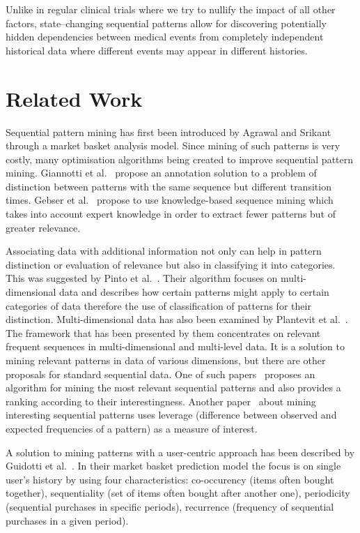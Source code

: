 \documentclass[runningheads,a4paper]{llncs}
\begin{document}
Unlike in regular clinical trials where we try to nullify the impact of all other factors, state--changing sequential patterns allow for discovering potentially hidden dependencies between medical events from completely independent historical data where different events may appear in different histories.

\section{Related Work}
\label{sec:related}
Sequential pattern mining has first been introduced by Agrawal and Srikant~\cite{Agrawal:1995} through a market basket analysis model.
Since mining of such patterns is very costly, many optimisation algorithms being created to improve sequential pattern mining.
Giannotti et al.~\cite{Giannotti:2006} propose an annotation solution to a problem of distinction between patterns with the same sequence but different transition times.
Gebser et al.~\cite{Gebser:2016} propose to use knowledge-based sequence mining which takes into account expert knowledge in order to extract fewer patterns but of greater relevance.

Associating data with additional information not only can help in pattern distinction or evaluation of relevance but also in classifying it into categories.
This was suggested by Pinto et al.~\cite{Pinto:2001}.
Their algorithm focuses on multi-dimensional data and describes how certain patterns might apply to certain categories of data therefore the use of classification of patterns for their distinction.
Multi-dimensional data has also been examined by Plantevit et al.~\cite{Plantevit:2010}.
The framework that has been presented by them concentrates on relevant frequent sequences in multi-dimensional and multi-level data.
It is a solution to mining relevant patterns in data of various dimensions, but there are other proposals for standard sequential data.
One of such papers~\cite{Fowkes:2016} proposes an algorithm for mining the most relevant sequential patterns and also provides a ranking according to their interestingness.
Another paper~\cite{Li:2015} about mining interesting sequential patterns uses leverage (difference between observed and expected frequencies of a pattern) as a measure of interest.

A solution to mining patterns with a user-centric approach has been described by Guidotti et al.~\cite{Guidotti:2017}.
In their market basket prediction model the focus is on single user’s history by using four characteristics: co-occurency (items often bought together), sequentiality (set of items often bought after another one), periodicity (sequential purchases in specific periods), recurrence (frequency of sequential purchases in a given period).
\end{document}
